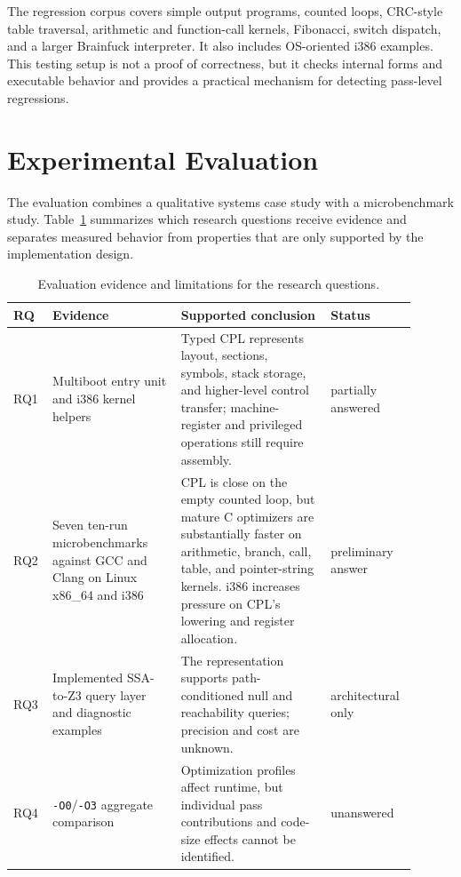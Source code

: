 \documentclass[10pt,twocolumn]{article}
\begin{document}
\par The regression corpus covers simple output programs, counted loops, CRC-style table traversal, arithmetic and function-call kernels, Fibonacci, switch dispatch, and a larger Brainfuck interpreter. It also includes OS-oriented i386 examples. This testing setup is not a proof of correctness, but it checks internal forms and executable behavior and provides a practical mechanism for detecting pass-level regressions.

\section{Experimental Evaluation}
\label{sec:evaluation}

\par The evaluation combines a qualitative systems case study with a microbenchmark study. Table~\ref{tab:rq-evidence} summarizes which research questions receive evidence and separates measured behavior from properties that are only supported by the implementation design.

\begin{table}[t]
\centering
\caption{Evaluation evidence and limitations for the research questions.}
\label{tab:rq-evidence}
\begin{tabular}{p{0.08\linewidth}p{0.30\linewidth}p{0.35\linewidth}p{0.17\linewidth}}
\toprule
RQ & Evidence & Supported conclusion & Status \\
\midrule
RQ1 & Multiboot entry unit and i386 kernel helpers & Typed CPL represents layout, sections, symbols, stack storage, and higher-level control transfer; machine-register and privileged operations still require assembly. & partially answered \\
RQ2 & Seven ten-run microbenchmarks against GCC and Clang on Linux x86\_64 and i386 & CPL is close on the empty counted loop, but mature C optimizers are substantially faster on arithmetic, branch, call, table, and pointer-string kernels. i386 increases pressure on CPL's lowering and register allocation. & preliminary answer \\
RQ3 & Implemented SSA-to-Z3 query layer and diagnostic examples & The representation supports path-conditioned null and reachability queries; precision and cost are unknown. & architectural only \\
RQ4 & \texttt{-O0}/\texttt{-O3} aggregate comparison & Optimization profiles affect runtime, but individual pass contributions and code-size effects cannot be identified. & unanswered \\
\bottomrule
\end{tabular}
\end{table}
\end{document}
